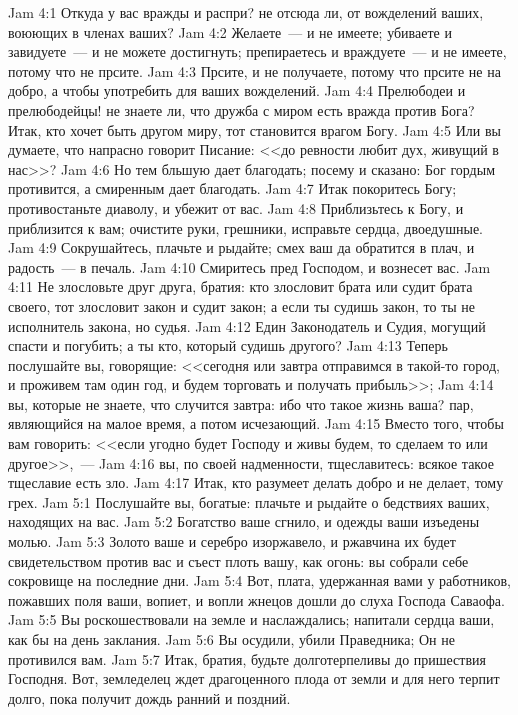 \vs Jam 4:1 Откуда у вас вражды и распри? не отсюда ли, от вожделений ваших, воюющих в членах ваших?
\vs Jam 4:2 Желаете~--- и не имеете; убиваете и завидуете~--- и не можете достигнуть; препираетесь и враждуете~--- и не имеете, потому что не прсите.
\vs Jam 4:3 Прсите, и не получаете, потому что прсите не на добро, а чтобы употребить для ваших вожделений.
\vs Jam 4:4 Прелюбодеи и прелюбодейцы! не знаете ли, что дружба с миром есть вражда против Бога? Итак, кто хочет быть другом миру, тот становится врагом Богу.
\vs Jam 4:5 Или вы думаете, что напрасно говорит Писание: <<до ревности любит дух, живущий в нас>>?
\vs Jam 4:6 Но тем бльшую дает благодать; посему и сказано: Бог гордым противится, а смиренным дает благодать.
\rsbpar\vs Jam 4:7 Итак покоритесь Богу; противостаньте диаволу, и убежит от вас.
\vs Jam 4:8 Приблизьтесь к Богу, и приблизится к вам; очистите руки, грешники, исправьте сердца, двоедушные.
\vs Jam 4:9 Сокрушайтесь, плачьте и рыдайте; смех ваш да обратится в плач, и радость~--- в печаль.
\vs Jam 4:10 Смиритесь пред Господом, и вознесет вас.
\rsbpar\vs Jam 4:11 Не злословьте друг друга, братия: кто злословит брата или судит брата своего, тот злословит закон и судит закон; а если ты судишь закон, то ты не исполнитель закона, но судья.
\vs Jam 4:12 Един Законодатель и Судия, могущий спасти и погубить; а ты кто, который судишь другого?
\rsbpar\vs Jam 4:13 Теперь послушайте вы, говорящие: <<сегодня или завтра отправимся в такой-то город, и проживем там один год, и будем торговать и получать прибыль>>;
\vs Jam 4:14 вы, которые не знаете, что случится завтра: ибо что такое жизнь ваша? пар, являющийся на малое время, а потом исчезающий.
\vs Jam 4:15 Вместо того, чтобы вам говорить: <<если угодно будет Господу и живы будем, то сделаем то или другое>>,~---
\vs Jam 4:16 вы, по своей надменности, тщеславитесь: всякое такое тщеславие есть зло.
\vs Jam 4:17 Итак, кто разумеет делать добро и не делает, тому грех.
\vs Jam 5:1 Послушайте вы, богатые: плачьте и рыдайте о бедствиях ваших, находящих на вас.
\vs Jam 5:2 Богатство ваше сгнило, и одежды ваши изъедены молью.
\vs Jam 5:3 Золото ваше и серебро изоржавело, и ржавчина их будет свидетельством против вас и съест плоть вашу, как огонь: вы собрали себе сокровище на последние дни.
\vs Jam 5:4 Вот, плата, удержанная вами у работников, пожавших поля ваши, вопиет, и вопли жнецов дошли до слуха Господа Саваофа.
\vs Jam 5:5 Вы роскошествовали на земле и наслаждались; напитали сердца ваши, как бы на день заклания.
\vs Jam 5:6 Вы осудили, убили Праведника; Он не противился вам.
\rsbpar\vs Jam 5:7 Итак, братия, будьте долготерпеливы до пришествия Господня. Вот, земледелец ждет драгоценного плода от земли и для него терпит долго, пока получит дождь ранний и поздний.
